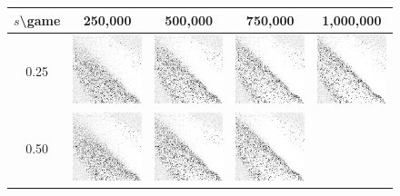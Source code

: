 \begin{figure}[h]
	\centering

	\begin{tabular}{c | c c c c}
		$s$\textbackslash game & 250,000 & 500,000 & 750,000 & 1,000,000 \\
		\hline
		0.25 & %
			\includegraphics[width=2cm]{images/findings/experiments/learning_rate/lr_025_250.png} & %
			\includegraphics[width=2cm]{images/findings/experiments/learning_rate/lr_025_500.png} & %
			\includegraphics[width=2cm]{images/findings/experiments/learning_rate/lr_025_750.png} & %
			\includegraphics[width=2cm]{images/findings/experiments/learning_rate/lr_025_1mm.png} \\ %
		0.50 & 
			\includegraphics[width=2cm]{images/findings/experiments/learning_rate/lr_050_250.png} & %
			\includegraphics[width=2cm]{images/findings/experiments/learning_rate/lr_050_500.png} & %
			\includegraphics[width=2cm]{images/findings/experiments/learning_rate/lr_050_750.png} & %

\end{tabular}
\end{figure}
